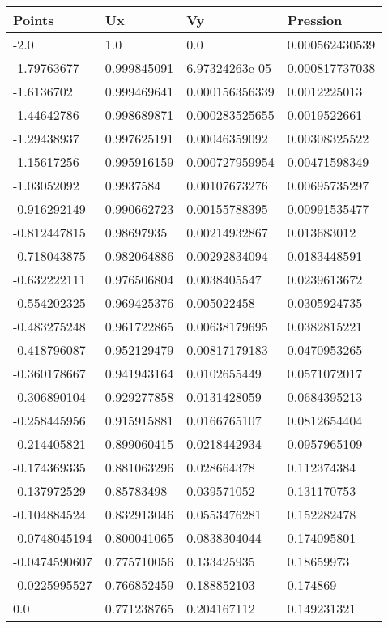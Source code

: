 \begin{longtable}{llll}
	Points & Ux & Vy & Pression \\ 
\midrule 
	-2.0 & 1.0 & 0.0 & 0.000562430539 \\ 
	-1.79763677 & 0.999845091 & 6.97324263e-05 & 0.000817737038 \\ 
	-1.6136702 & 0.999469641 & 0.000156356339 & 0.0012225013 \\ 
	-1.44642786 & 0.998689871 & 0.000283525655 & 0.0019522661 \\ 
	-1.29438937 & 0.997625191 & 0.00046359092 & 0.00308325522 \\ 
	-1.15617256 & 0.995916159 & 0.000727959954 & 0.00471598349 \\ 
	-1.03052092 & 0.9937584 & 0.00107673276 & 0.00695735297 \\ 
	-0.916292149 & 0.990662723 & 0.00155788395 & 0.00991535477 \\ 
	-0.812447815 & 0.98697935 & 0.00214932867 & 0.013683012 \\ 
	-0.718043875 & 0.982064886 & 0.00292834094 & 0.0183448591 \\ 
	-0.632222111 & 0.976506804 & 0.0038405547 & 0.0239613672 \\ 
	-0.554202325 & 0.969425376 & 0.005022458 & 0.0305924735 \\ 
	-0.483275248 & 0.961722865 & 0.00638179695 & 0.0382815221 \\ 
	-0.418796087 & 0.952129479 & 0.00817179183 & 0.0470953265 \\ 
	-0.360178667 & 0.941943164 & 0.0102655449 & 0.0571072017 \\ 
	-0.306890104 & 0.929277858 & 0.0131428059 & 0.0684395213 \\ 
	-0.258445956 & 0.915915881 & 0.0166765107 & 0.0812654404 \\ 
	-0.214405821 & 0.899060415 & 0.0218442934 & 0.0957965109 \\ 
	-0.174369335 & 0.881063296 & 0.028664378 & 0.112374384 \\ 
	-0.137972529 & 0.85783498 & 0.039571052 & 0.131170753 \\ 
	-0.104884524 & 0.832913046 & 0.0553476281 & 0.152282478 \\ 
	-0.0748045194 & 0.800041065 & 0.0838304044 & 0.174095801 \\ 
	-0.0474590607 & 0.775710056 & 0.133425935 & 0.18659973 \\ 
	-0.0225995527 & 0.766852459 & 0.188852103 & 0.174869 \\ 
	0.0 & 0.771238765 & 0.204167112 & 0.149231321 \\ 

\end{longtable}

